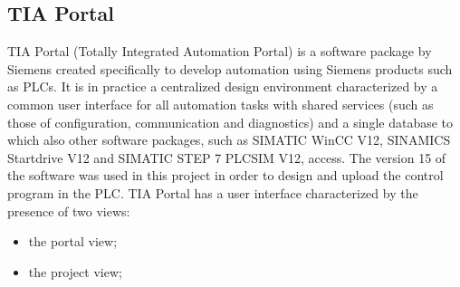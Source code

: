 \documentclass[a4paper,11pt]{report}
\theoremstyle{definition}
\theoremstyle{plain}
\begin{document}
        \subsection{TIA Portal}
            TIA Portal (Totally Integrated Automation Portal) is a software package by Siemens created specifically to develop automation using Siemens products such as PLCs. It is in practice a centralized design environment characterized by a common user interface for all automation tasks with shared services (such as those of configuration, communication and diagnostics) and a single database to which also other software packages, such as SIMATIC WinCC V12, SINAMICS Startdrive V12 and SIMATIC STEP 7 PLCSIM V12, access. The version 15 of the software was used in this project in order to design and upload the control program in the PLC. TIA Portal has a user interface characterized by the presence of two views:
            \begin{itemize}
                \item the portal view;
                \item the project view;
            \end{itemize}
\end{document}
